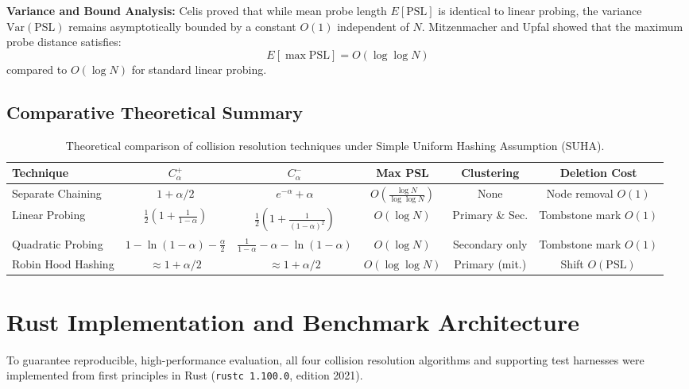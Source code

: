 \documentclass[conference]{IEEEtran}
\begin{document}
\textbf{Variance and Bound Analysis:} Celis \cite{celis1986} proved that while mean probe length $E[\text{PSL}]$ is identical to linear probing, the variance $\text{Var}(\text{PSL})$ remains asymptotically bounded by a constant $O(1)$ independent of $N$. Mitzenmacher and Upfal \cite{mitzenmacher2017} showed that the maximum probe distance satisfies:
\begin{equation}
E[\max \text{PSL}] = O(\log \log N)
\end{equation}
compared to $O(\log N)$ for standard linear probing.

\subsection{Comparative Theoretical Summary}

\begin{table}[t]
\centering
\caption{Theoretical comparison of collision resolution techniques under Simple Uniform Hashing Assumption (SUHA).}
\label{tbl:theoretical_summary}
\begin{tabular}{lccccc}
\toprule
\textbf{Technique} & \textbf{$C^+_\alpha$} & \textbf{$C^-_\alpha$} & \textbf{Max PSL} & \textbf{Clustering} & \textbf{Deletion Cost} \\
\midrule
Separate Chaining & $1 + \alpha/2$ & $e^{-\alpha} + \alpha$ & $O(\frac{\log N}{\log \log N})$ & None & Node removal $O(1)$ \\
Linear Probing & $\frac{1}{2}(1 + \frac{1}{1-\alpha})$ & $\frac{1}{2}(1 + \frac{1}{(1-\alpha)^2})$ & $O(\log N)$ & Primary \& Sec. & Tombstone mark $O(1)$ \\
Quadratic Probing & $1 - \ln(1-\alpha) - \frac{\alpha}{2}$ & $\frac{1}{1-\alpha} - \alpha - \ln(1-\alpha)$ & $O(\log N)$ & Secondary only & Tombstone mark $O(1)$ \\
Robin Hood Hashing & $\approx 1 + \alpha/2$ & $\approx 1 + \alpha/2$ & $O(\log \log N)$ & Primary (mit.) & Shift $O(\text{PSL})$ \\
\bottomrule
\end{tabular}
\end{table}

\section{Rust Implementation and Benchmark Architecture}

To guarantee reproducible, high-performance evaluation, all four collision resolution algorithms and supporting test harnesses were implemented from first principles in Rust (\texttt{rustc 1.100.0}, edition 2021).
\end{document}
